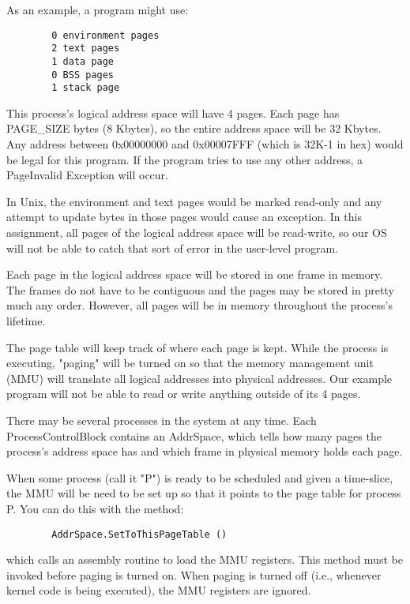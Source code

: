 \documentclass[12pt]{article}
\begin{document}
As an example, a program might use:

\begin{verbatim}
        0 environment pages
        2 text pages
        1 data page
        0 BSS pages
        1 stack page
\end{verbatim}

This process's logical address space will have 4 pages.  Each page has
PAGE\_SIZE bytes (8 Kbytes), so the entire address space will be 32
Kbytes.  Any address between 0x00000000 and 0x00007FFF (which is 32K-1
in hex) would be legal for this program.  If the program tries to use
any other address, a PageInvalid Exception will occur.

In Unix, the environment and text pages would be marked read-only and
any attempt to update bytes in those pages would cause an exception.
In this assignment, all pages of the logical address space will be
read-write, so our OS will not be able to catch that sort of error in
the user-level program.

Each page in the logical address space will be stored in one frame in
memory.  The frames do not have to be contiguous and the pages may be
stored in pretty much any order.  However, all pages will be in memory
throughout the process's lifetime.

The page table will keep track of where each page is kept.  While the
process is executing, "paging" will be turned on so that the memory
management unit (MMU) will translate all logical addresses into
physical addresses.  Our example program will not be able to read or
write anything outside of its 4 pages.

There may be several processes in the system at any time.  Each
ProcessControlBlock contains an AddrSpace, which tells how many pages
the process's address space has and which frame in physical memory
holds each page.

When some process (call it "P") is ready to be scheduled and given a
time-slice, the MMU will be need to be set up so that it points to the
page table for process P.  You can do this with the method:

\begin{verbatim}
        AddrSpace.SetToThisPageTable ()
\end{verbatim}

which calls an assembly routine to load the MMU registers.  This
method must be invoked before paging is turned on.  When paging is
turned off (i.e., whenever kernel code is being executed), the MMU
registers are ignored.
\end{document}
